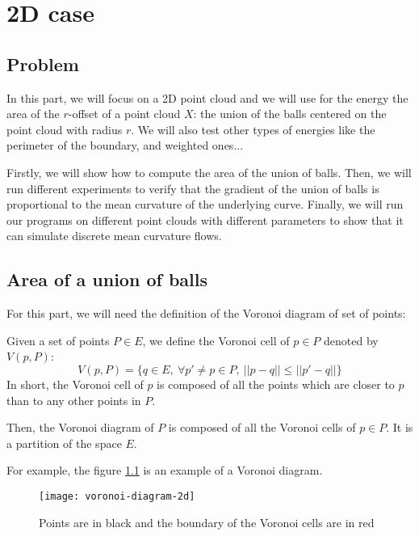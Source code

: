 \chapter{2D case}

\section{Problem}

In this part, we will focus on a 2D point cloud and we will use for the energy
the area of the $ r $-offset of a point cloud $ X $: the union of the balls
centered on the point cloud with radius $r$. We will also test other types of
energies like the perimeter of the boundary, and weighted ones...

Firstly, we will show how to compute the area of the union of balls.
Then, we will run different experiments to verify that the gradient of
the union of balls is proportional to the mean curvature of the underlying
curve. Finally, we will run our programs on different point clouds with
different parameters to show that it can simulate discrete mean curvature flows.

\section{Area of a union of balls}

For this part, we will need the definition of the Voronoi diagram of set of
points:

\begin{definition}
    Given a set of points $ P \in E $, we define the Voronoi cell of $ p \in P $
    denoted by $ V(p, P) $:
    $$ V(p, P) = \{ q \in E,~ \forall p' \neq p \in P,~|| p  - q || \leq || p' -
    q || \} $$
    In short, the Voronoi cell of $ p $ is composed of all the points which are
    closer to $ p $ than to any other points in $ P $.

    Then, the Voronoi diagram of $ P $ is composed of all the Voronoi cells of $
    p \in P $. It is a partition of the space $ E $.
\end{definition}

For example, the figure \ref{fig:voronoi-diagram-2d} is an example of a Voronoi
diagram.

\begin{figure}[h]
    \centering
    \texttt{[image: voronoi-diagram-2d]}
    \caption{Points are in black and the boundary of the Voronoi cells are in
        red}
    \label{fig:voronoi-diagram-2d}
\end{figure}

